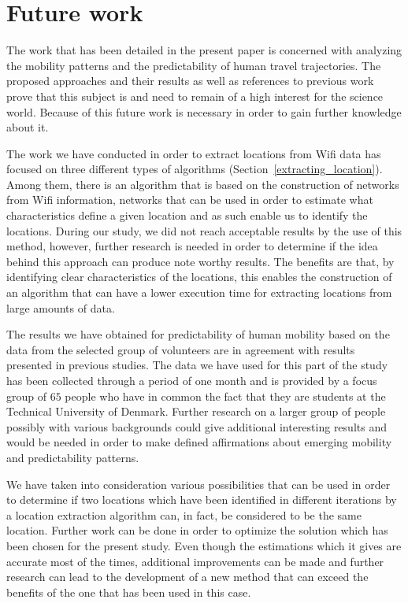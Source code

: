 \chapter{Future work}

The work that has been detailed in the present paper is concerned with analyzing
the mobility patterns and the predictability of human travel trajectories. The
proposed approaches and their results as well as references to previous work
prove that this subject is and need to remain of a high interest for the science
world. Because of this future work is necessary in order to gain further
knowledge about it.

The work we have conducted in order to extract locations from Wifi data has
focused on three different types of algorithms
(Section~\ref{extracting_location}). Among them, there is an algorithm that is
based on the construction of networks from Wifi information, networks that can
be used in order to estimate what characteristics define a given location and as
such enable us to identify the locations. During our study, we did not reach
acceptable results by the use of this method, however, further research is
needed in order to determine if the idea behind this approach can produce note
worthy results. The benefits are that, by identifying clear characteristics of
the locations, this enables the construction of an algorithm that can have a
lower execution time for extracting locations from large amounts of data.

The results we have obtained for predictability of human mobility based on the
data from the selected group of volunteers are in agreement with results
presented in previous studies. The data we have used for this part of the study
has been collected through a period of one month and is provided by a focus
group of $65$ people who have in common the fact that they are students at the
Technical University of Denmark. Further research on a larger group of people
possibly with various backgrounds could give additional interesting results and
would be needed in order to make defined affirmations about emerging mobility
and predictability patterns.

We have taken into consideration various possibilities that can be used in order
to determine if two locations which have been identified in different
iterations by a location extraction algorithm can, in fact, be considered to be
the same location. Further work can be done in order to optimize the solution
which has been chosen for the present study. Even though the estimations which it
gives are accurate most of the times, additional improvements can be made and
further research can lead to the development of a new method that can exceed the
benefits of the one that has been used in this case.

